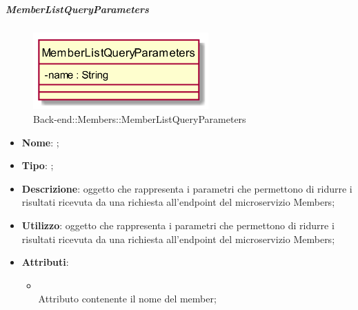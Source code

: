 \hypertarget{MemberListQueryParameters_label}{\subparagraph{MemberListQueryParameters}}
\begin{figure}[h]
	\centering
	\includegraphics[width=0.60\textwidth,height=\textheight,keepaspectratio]{images/ClassMemberListQueryParameters.png}
	\caption{Back-end::Members::MemberListQueryParameters}
\end{figure}
\begin{itemize}
	\item \textbf{Nome}: ;
	\item \textbf{Tipo}: ;
	\item \textbf{Descrizione}: oggetto che rappresenta i parametri che permettono di ridurre i risultati ricevuta da una richiesta all'endpoint  del microservizio Members;
	\item \textbf{Utilizzo}: oggetto che rappresenta i parametri che permettono di ridurre i risultati ricevuta da una richiesta all'endpoint  del microservizio Members;
	\item \textbf{Attributi}:
	\begin{itemize}
		\item[]  \\
		Attributo contenente il nome del member;
	\end{itemize}
\end{itemize}
\FloatBarrier


